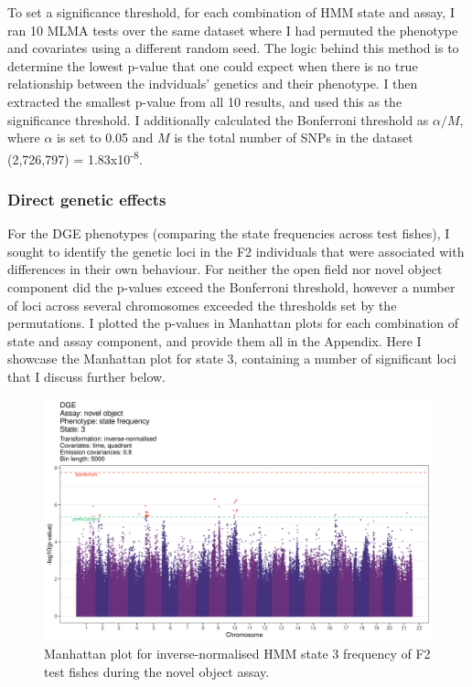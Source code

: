 \documentclass[
]{book}
\begin{document}
To set a significance threshold, for each combination of HMM state and assay, I ran 10 MLMA tests over the same dataset where I had permuted the phenotype and covariates using a different random seed. The logic behind this method is to determine the lowest p-value that one could expect when there is no true relationship between the indviduals' genetics and their phenotype. I then extracted the smallest p-value from all 10 results, and used this as the significance threshold. I additionally calculated the Bonferroni threshold as \(\alpha / M\), where \(\alpha\) is set to 0.05 and \(M\) is the total number of SNPs in the dataset (2,726,797) = 1.83x10\textsuperscript{-8}.

\hypertarget{direct-genetic-effects-2}{%
\subsubsection{Direct genetic effects}\label{direct-genetic-effects-2}}

For the DGE phenotypes (comparing the state frequencies across test fishes), I sought to identify the genetic loci in the F2 individuals that were associated with differences in their own behaviour. For neither the open field nor novel object component did the p-values exceed the Bonferroni threshold, however a number of loci across several chromosomes exceeded the thresholds set by the permutations. I plotted the p-values in Manhattan plots for each combination of state and assay component, and provide them all in the Appendix. Here I showcase the Manhattan plot for state 3, containing a number of significant loci that I discuss further below.



\begin{figure}
\includegraphics[width=1\linewidth]{figs/mikk_behaviour/manhattans/dge_no_3_time-quadrant} \caption{Manhattan plot for inverse-normalised HMM state 3 frequency of F2 test fishes during the novel object assay.}\label{fig:F2-man-dge-no-3}
\end{figure}
\end{document}
